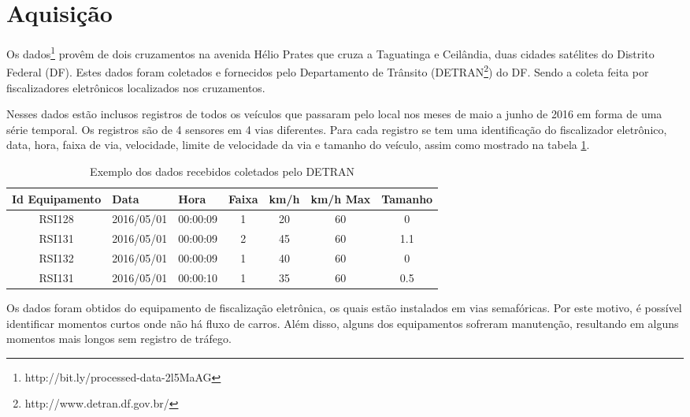 \section{Aquisição}

Os dados\footnote{http://bit.ly/processed-data-2l5MaAG} provêm de dois cruzamentos na avenida Hélio Prates que cruza a Taguatinga e Ceilândia, duas cidades satélites do Distrito Federal (DF). Estes dados foram coletados e fornecidos pelo Departamento de Trânsito (\acrfull{DETRAN}\footnote{http://www.detran.df.gov.br/}) do \acrfull{DF}. Sendo a coleta feita por fiscalizadores eletrônicos localizados nos cruzamentos.

Nesses dados estão inclusos registros de todos os veículos que passaram pelo local nos meses de maio a junho de 2016 em forma de uma série temporal. Os registros são de 4 sensores em 4 vias diferentes. Para cada registro se tem uma identificação do fiscalizador eletrônico, data, hora, faixa de via, velocidade, limite de velocidade da via e tamanho do veículo, assim como mostrado na tabela \ref{table:data}.

\begin{table}[h]
    \begin{tabular}{ccccccc}
    \toprule
    \multicolumn{1}{l}{\textbf{Id Equipamento}} & \multicolumn{1}{l}{\textbf{Data}} & \multicolumn{1}{l}{\textbf{Hora}} & \multicolumn{1}{l}{\textbf{Faixa}} & \multicolumn{1}{l}{\textbf{km/h}} & \multicolumn{1}{l}{\textbf{km/h Max}} & \multicolumn{1}{l}{\textbf{Tamanho}} \\ 
    \midrule
    RSI128 & 2016/05/01 & 00:00:09 & 1 & 20 & 60 & 0 \\
    RSI131 & 2016/05/01 & 00:00:09 & 2 & 45 & 60 & 1.1 \\
    RSI132 & 2016/05/01 & 00:00:09 & 1 & 40 & 60 & 0 \\
    RSI131 & 2016/05/01 & 00:00:10 & 1 & 35 & 60 & 0.5 \\ 
    \bottomrule
    \end{tabular}
    \label{table:data}
    \caption{Exemplo dos dados recebidos coletados pelo \acrshort{DETRAN}}
\end{table}

Os dados foram obtidos do equipamento de fiscalização eletrônica, os quais estão instalados em vias semafóricas. Por este motivo, é possível identificar momentos curtos onde não há fluxo de carros. Além disso, alguns dos equipamentos sofreram manutenção, resultando em alguns momentos mais longos sem registro de tráfego.


